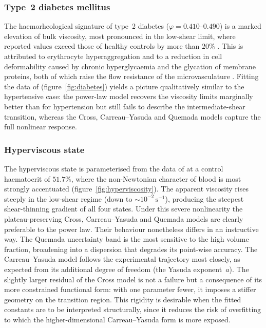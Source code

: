 \documentclass[lineno]{jfm}
\begin{document}
{\subsubsection{Type~2 diabetes mellitus}
The haemorheological signature of type~2 diabetes ($\varphi=0.410$--$0.490$) is a
marked elevation of bulk viscosity, most pronounced in the low-shear limit,
where reported values exceed those of healthy controls by more than $20\%$
\citep{cho2008hemorheological}. This is attributed to erythrocyte hyperaggregation and to a
reduction in cell deformability caused by chronic hyperglycaemia and the
glycation of membrane proteins, both of which raise the flow resistance of the
microvasculature \citep{Sun2022}. Fitting the data of \citet{cho2008hemorheological}
(figure~\ref{fig:diabetes}) yields a picture qualitatively similar to the
hypertensive case: the power-law model recovers the viscosity limits marginally
better than for hypertension but still fails to describe the intermediate-shear
transition, whereas the Cross, Carreau--Yasuda and Quemada models capture the
full nonlinear response.

\subsubsection{Hyperviscous state}
The hyperviscous state is parameterised from the data of \citet{Chien1966} at a
control haematocrit of $51.7\%$, where the non-Newtonian character of blood is
most strongly accentuated (figure~\ref{fig:hyperviscosity}). The apparent
viscosity rises steeply in the low-shear regime (down to
$\sim\!10^{-2}\,\mathrm{s}^{-1}$), producing the steepest shear-thinning
gradient of all four states. Under this severe nonlinearity the plateau-preserving
Cross, Carreau--Yasuda and Quemada models are clearly preferable to the power law.
Their behaviour nonetheless differs in an instructive way. The Quemada
uncertainty band is the most sensitive to the high volume fraction, broadening
into a dispersion that degrades its point-wise accuracy. The Carreau--Yasuda
model follows the experimental trajectory most closely, as expected from its
additional degree of freedom (the Yasuda exponent~$a$). The slightly larger
residual of the Cross model is not a failure but a consequence of its more
constrained functional form: with one parameter fewer, it imposes a stiffer
geometry on the transition region. This rigidity is desirable when the fitted
constants are to be interpreted structurally, since it reduces the risk of
overfitting to which the higher-dimensional Carreau--Yasuda form is more exposed.}
\end{document}
